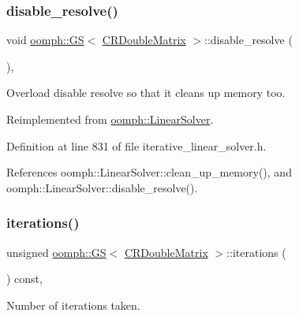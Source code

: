 \subsubsection{\texorpdfstring{disable\+\_\+resolve()}{disable\_resolve()}}
{\footnotesize\ttfamily void \hyperlink{classoomph_1_1GS}{oomph\+::\+GS}$<$ \hyperlink{classoomph_1_1CRDoubleMatrix}{C\+R\+Double\+Matrix} $>$\+::disable\+\_\+resolve (\begin{DoxyParamCaption}{ }\end{DoxyParamCaption})\hspace{0.3cm}{\ttfamily [inline]}, {\ttfamily [virtual]}}



Overload disable resolve so that it cleans up memory too. 



Reimplemented from \hyperlink{classoomph_1_1LinearSolver_ad61c63af94c5961830bd9807225a48d6}{oomph\+::\+Linear\+Solver}.



Definition at line 831 of file iterative\+\_\+linear\+\_\+solver.\+h.



References oomph\+::\+Linear\+Solver\+::clean\+\_\+up\+\_\+memory(), and oomph\+::\+Linear\+Solver\+::disable\+\_\+resolve().

\mbox{\label{classoomph_1_1GS_3_01CRDoubleMatrix_01_4_a0fe8a3e90df149b2ad6a247afe1adf2a}} 
\subsubsection{\texorpdfstring{iterations()}{iterations()}}
{\footnotesize\ttfamily unsigned \hyperlink{classoomph_1_1GS}{oomph\+::\+GS}$<$ \hyperlink{classoomph_1_1CRDoubleMatrix}{C\+R\+Double\+Matrix} $>$\+::iterations (\begin{DoxyParamCaption}{ }\end{DoxyParamCaption}) const\hspace{0.3cm}{\ttfamily [inline]}, {\ttfamily [virtual]}}



Number of iterations taken. 



